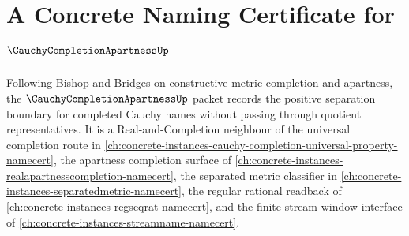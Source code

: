 \chapter{A Concrete Naming Certificate for $\CauchyCompletionApartnessUp$}
\label{ch:concrete-instances-cauchy-completion-apartness-namecert}

Following Bishop and Bridges on constructive metric completion and apartness, the $\CauchyCompletionApartnessUp$ packet records the positive separation boundary for completed Cauchy names without passing through quotient representatives. It is a Real-and-Completion neighbour of the universal completion route in \autoref{ch:concrete-instances-cauchy-completion-universal-property-namecert}, the apartness completion surface of \autoref{ch:concrete-instances-realapartnesscompletion-namecert}, the separated metric classifier in \autoref{ch:concrete-instances-separatedmetric-namecert}, the regular rational readback of \autoref{ch:concrete-instances-regseqrat-namecert}, and the finite stream window interface of \autoref{ch:concrete-instances-streamname-namecert}.

